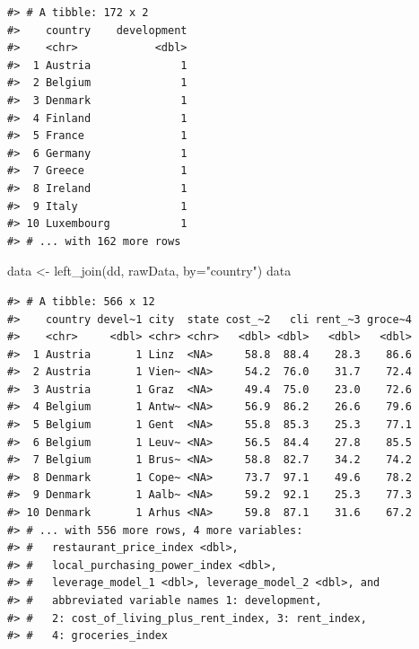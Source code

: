 \documentclass[
  11pt,
  a4paper,
  twoside]{scrbook}
\newenvironment{Shaded}{\begin{snugshade}}{\end{snugshade}}
\newcommand{\AttributeTok}[1]{\textcolor[rgb]{0.77,0.63,0.00}{#1}}
\newcommand{\FunctionTok}[1]{\textcolor[rgb]{0.00,0.00,0.00}{#1}}
\newcommand{\NormalTok}[1]{#1}
\newcommand{\OtherTok}[1]{\textcolor[rgb]{0.56,0.35,0.01}{#1}}
\newcommand{\SpecialCharTok}[1]{\textcolor[rgb]{0.00,0.00,0.00}{#1}}
\newcommand{\StringTok}[1]{\textcolor[rgb]{0.31,0.60,0.02}{#1}}
\begin{document}
\linespread{1}

\begin{verbatim}
#> # A tibble: 172 x 2
#>    country    development
#>    <chr>            <dbl>
#>  1 Austria              1
#>  2 Belgium              1
#>  3 Denmark              1
#>  4 Finland              1
#>  5 France               1
#>  6 Germany              1
#>  7 Greece               1
#>  8 Ireland              1
#>  9 Italy                1
#> 10 Luxembourg           1
#> # ... with 162 more rows
\end{verbatim}

\linespread{1}

\begin{Shaded}
\begin{Highlighting}[]

\NormalTok{data }\OtherTok{\textless{}{-}} \FunctionTok{left\_join}\NormalTok{(dd, rawData, }\AttributeTok{by=}\StringTok{"country"}\NormalTok{)}
\NormalTok{data}
\end{Highlighting}
\end{Shaded}

\linespread{1}

\begin{verbatim}
#> # A tibble: 566 x 12
#>    country devel~1 city  state cost_~2   cli rent_~3 groce~4
#>    <chr>     <dbl> <chr> <chr>   <dbl> <dbl>   <dbl>   <dbl>
#>  1 Austria       1 Linz  <NA>     58.8  88.4    28.3    86.6
#>  2 Austria       1 Vien~ <NA>     54.2  76.0    31.7    72.4
#>  3 Austria       1 Graz  <NA>     49.4  75.0    23.0    72.6
#>  4 Belgium       1 Antw~ <NA>     56.9  86.2    26.6    79.6
#>  5 Belgium       1 Gent  <NA>     55.8  85.3    25.3    77.1
#>  6 Belgium       1 Leuv~ <NA>     56.5  84.4    27.8    85.5
#>  7 Belgium       1 Brus~ <NA>     58.8  82.7    34.2    74.2
#>  8 Denmark       1 Cope~ <NA>     73.7  97.1    49.6    78.2
#>  9 Denmark       1 Aalb~ <NA>     59.2  92.1    25.3    77.3
#> 10 Denmark       1 Arhus <NA>     59.8  87.1    31.6    67.2
#> # ... with 556 more rows, 4 more variables:
#> #   restaurant_price_index <dbl>,
#> #   local_purchasing_power_index <dbl>,
#> #   leverage_model_1 <dbl>, leverage_model_2 <dbl>, and
#> #   abbreviated variable names 1: development,
#> #   2: cost_of_living_plus_rent_index, 3: rent_index,
#> #   4: groceries_index
\end{verbatim}

\linespread{1}

\begin{Shaded}
\end{Shaded}
\end{document}
